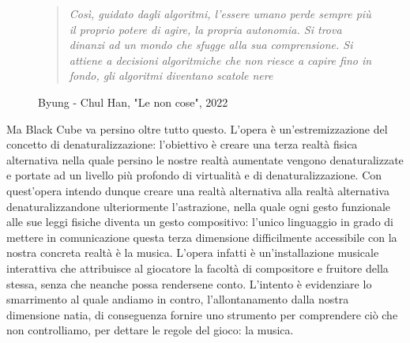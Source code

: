 	\begin{figure}[h] %
		\begin{quote}
			\textit{Così, guidato dagli algoritmi, l'essere umano perde sempre più il proprio potere di agire, la propria autonomia. Si trova dinanzi ad un mondo che sfugge alla sua comprensione. Si attiene a decisioni algoritmiche che non riesce a capire fino in fondo, gli algoritmi diventano scatole nere}
		\end{quote}
		\caption{Byung - Chul Han, "Le non cose", 2022}
	\end{figure}
	
	Ma Black Cube va persino oltre tutto questo. L'opera è un'estremizzazione del concetto di denaturalizzazione: l'obiettivo è creare una terza realtà fisica alternativa nella quale persino le nostre realtà aumentate vengono denaturalizzate e portate ad un livello più profondo di virtualità e di denaturalizzazione.
	Con quest'opera intendo dunque creare una realtà alternativa alla realtà alternativa denaturalizzandone ulteriormente l'astrazione, nella quale ogni gesto funzionale alle sue leggi fisiche diventa un gesto compositivo: l'unico linguaggio in grado di mettere in comunicazione questa terza dimensione difficilmente accessibile con la nostra concreta realtà è la musica.
	L'opera infatti è un'installazione musicale interattiva che attribuisce al giocatore la facoltà di compositore e fruitore della stessa, senza che neanche possa rendersene conto.
	L'intento è evidenziare lo smarrimento al quale andiamo in contro, l'allontanamento dalla nostra dimensione natia, di conseguenza fornire uno strumento per comprendere ciò che non controlliamo, per dettare le regole del gioco: la musica.
	
